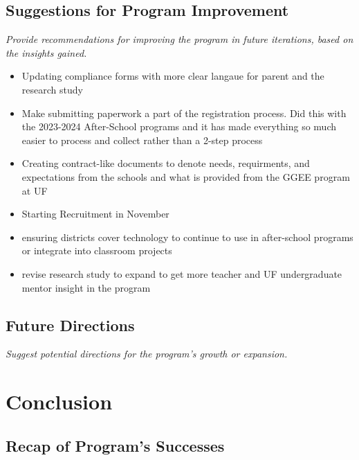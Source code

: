 \documentclass[
]{article}
\providecommand{\tightlist}{%
  \setlength{\itemsep}{0pt}\setlength{\parskip}{0pt}}
\begin{document}
\hypertarget{suggestions-for-program-improvement}{%
\subsection{Suggestions for Program
Improvement}\label{suggestions-for-program-improvement}}

\emph{Provide recommendations for improving the program in future
iterations, based on the insights gained.}

\begin{itemize}
\tightlist
\item
  Updating compliance forms with more clear langaue for parent and the
  research study
\item
  Make submitting paperwork a part of the registration process. Did this
  with the 2023-2024 After-School programs and it has made everything so
  much easier to process and collect rather than a 2-step process
\item
  Creating contract-like documents to denote needs, requirments, and
  expectations from the schools and what is provided from the GGEE
  program at UF
\item
  Starting Recruitment in November
\item
  ensuring districts cover technology to continue to use in after-school
  programs or integrate into classroom projects
\item
  revise research study to expand to get more teacher and UF
  undergraduate mentor insight in the program
\end{itemize}

\hypertarget{future-directions}{%
\subsection{Future Directions}\label{future-directions}}

\emph{Suggest potential directions for the program's growth or
expansion.}

\hypertarget{conclusion}{%
\section{Conclusion}\label{conclusion}}

\hypertarget{recap-of-programs-successes}{%
\subsection{Recap of Program's
Successes}\label{recap-of-programs-successes}}
\end{document}
